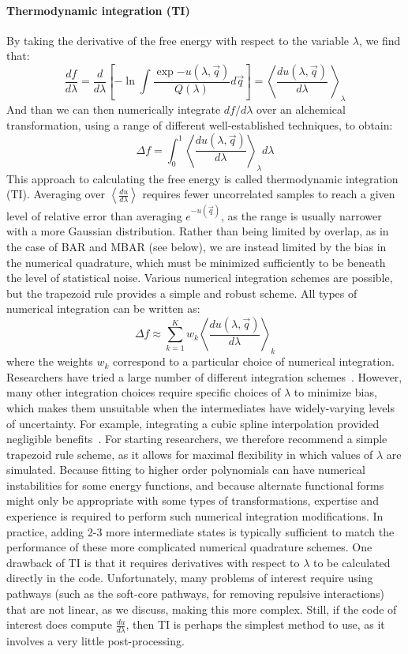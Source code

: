 \documentclass[9pt,bestpractices]{livecoms}
\newcommand{\expect}[1]{\left\langle{#1}\right\rangle}
\begin{document}
\paragraph{Thermodynamic integration (TI)}
By taking the derivative of the free energy with respect to the
variable $\lambda$, we find that:
\begin{equation}
\frac{df}{d\lambda} = \frac{d}{d\lambda} \left[-\ln \int \frac{\exp{-u(\lambda,\vec{q})}}{Q(\lambda)} d\vec{q}\right] = \expect{\frac{du(\lambda,\vec{q})}{d\lambda}\
}_{\lambda} 
\end{equation}
And than we can then numerically integrate $df/d\lambda$ over an alchemical transformation, using a range of different well-established techniques, to obtain:
\begin{equation}
\Delta f    = \int_{0}^{1} \expect{\frac{du(\lambda,\vec{q})}{d\lambda}}_{\lambda}  d\lambda    
\end{equation}
This approach to calculating the free energy is called thermodynamic integration (TI). Averaging over $\expect{\frac{du}{d\lambda}}$ requires fewer uncorrelated samples to reach a given level of relative error
than averaging $e^{-u(\vec{q})}$, as the range is usually narrower with a more Gaussian distribution. Rather than being limited by overlap, as in the case of BAR and MBAR (see below), we are instead limited by the bias in the numerical quadrature, which must be minimized sufficiently to be beneath the level of statistical noise.
%
Various numerical integration schemes are possible, but the trapezoid
rule provides a simple and robust scheme.  All types of numerical integration can be written as:
\[ \Delta f \approx \sum_{k=1}^{K} w_k
\expect{\frac{du(\lambda,\vec{q})}{d\lambda}}_{k} \] where the weights $w_k$ correspond to a particular choice of numerical integration.
Researchers have tried a large number of different integration schemes~\cite{resat1993studies,jorge2010effect,shyu2009reducing}. However, many other integration choices require specific choices of $\lambda$ to minimize bias, which makes them unsuitable when the intermediates
have widely-varying levels of uncertainty. For example, integrating a cubic spline interpolation provided negligible benefits~\cite{paliwal2011benchmark}. For starting researchers, we therefore recommend a simple trapezoid rule scheme, as it allows for maximal flexibility in which values of $\lambda$ are simulated.  Because fitting to higher order polynomials can have numerical instabilities for some energy functions, and because alternate functional forms might only be appropriate with some types of transformations, expertise and experience is required to perform such numerical integration modifications. In practice, adding 2-3 more intermediate states is typically sufficient to match the performance of these more complicated numerical quadrature schemes.
%
One drawback of TI is that it requires derivatives with respect to $\lambda$ to be calculated directly in the code. Unfortunately, many problems of interest require using pathways (such as the soft-core pathways, for removing repulsive interactions) that are not linear, as we discuss, making this more complex. Still, if the code of interest does compute $\frac{du}{d\lambda}$, then TI is perhaps the simplest method to use, as it involves a very little post-processing.
%
\end{document}
